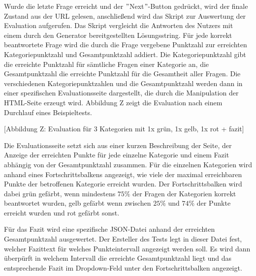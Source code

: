 Wurde die letzte Frage erreicht und der $"$Next$"$-Button gedrückt, wird der finale Zustand aus der URL gelesen, anschließend wird das Skript zur Auswertung der Evaluation aufgerufen. Das Skript vergleicht die Antworten des Nutzers mit einem durch den Generator bereitgestellten Lösungsstring. Für jede korrekt beantwortete Frage wird die durch die Frage vergebene Punktzahl zur erreichten Kategoriepunktzahl und Gesamtpunktzahl addiert. Die Kategoriepunktzahl gibt die erreichte Punktzahl für sämtliche Fragen einer Kategorie an, die Gesamtpunktzahl die erreichte Punktzahl für die Gesamtheit aller Fragen. Die verschiedenen Kategoriepunktzahlen und die Gesamtpunktzahl werden dann in einer spezifischen Evaluationsseite dargestellt, die durch die Manipulation der HTML-Seite erzeugt wird. Abbildung Z zeigt die Evaluation nach einem Durchlauf eines Beispieltests. 

[Abbildung Z: Evaluation für 3 Kategorien mit 1x grün, 1x gelb, 1x rot + fazit]

Die Evaluationsseite setzt sich aus einer kurzen Beschreibung der Seite, der Anzeige der erreichten Punkte für jede einzelne Kategorie und einem Fazit abhängig von der Gesamtpunktzahl zusammen. Für die einzelnen Kategorien wird anhand eines Fortschrittsbalkens angezeigt, wie viele der maximal erreichbaren Punkte der betroffenen Kategorie erreicht wurden. Der Fortschrittsbalken wird dabei grün gefärbt, wenn mindestens $75\%$ der Fragen der Kategorien korrekt beantwortet wurden, gelb gefärbt wenn zwischen $25\%$ und $74\%$ der Punkte erreicht wurden und rot gefärbt sonst.

Für das Fazit wird eine spezifische JSON-Datei anhand der erreichten Gesamtpunktzahl ausgewertet. Der Ersteller des Tests legt in dieser Datei fest, welcher Fazittext für welches Punkteintervall angezeigt werden soll. Es wird dann überpürft in welchem Intervall die erreichte Gesamtpunktzahl liegt und das entsprechende Fazit im Dropdown-Feld unter den Fortschrittsbalken angezeigt. 






